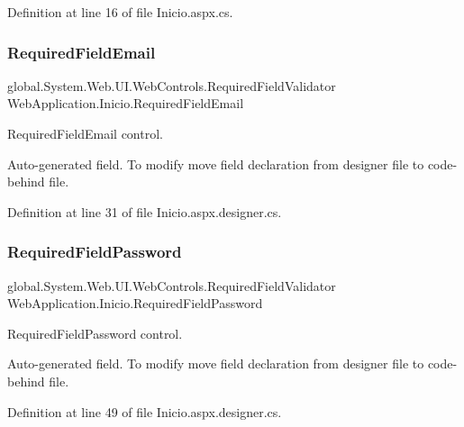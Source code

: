 Definition at line 16 of file Inicio.\+aspx.\+cs.

\mbox{\label{classWebApplication_1_1Inicio_a6060adcae37ac670afcf5c3ba229d926}} 
\subsubsection{\texorpdfstring{RequiredFieldEmail}{RequiredFieldEmail}}
{\footnotesize\ttfamily global.\+System.\+Web.\+U\+I.\+Web\+Controls.\+Required\+Field\+Validator Web\+Application.\+Inicio.\+Required\+Field\+Email\hspace{0.3cm}{\ttfamily [protected]}}



Required\+Field\+Email control. 

Auto-\/generated field. To modify move field declaration from designer file to code-\/behind file. 

Definition at line 31 of file Inicio.\+aspx.\+designer.\+cs.

\mbox{\label{classWebApplication_1_1Inicio_a47510251f435c39f6ca1b35d7db252d7}} 
\subsubsection{\texorpdfstring{RequiredFieldPassword}{RequiredFieldPassword}}
{\footnotesize\ttfamily global.\+System.\+Web.\+U\+I.\+Web\+Controls.\+Required\+Field\+Validator Web\+Application.\+Inicio.\+Required\+Field\+Password\hspace{0.3cm}{\ttfamily [protected]}}



Required\+Field\+Password control. 

Auto-\/generated field. To modify move field declaration from designer file to code-\/behind file. 

Definition at line 49 of file Inicio.\+aspx.\+designer.\+cs.

\mbox{\label{classWebApplication_1_1Inicio_a13ef502ea57d897fdd0ae107508d8fbb}} 
